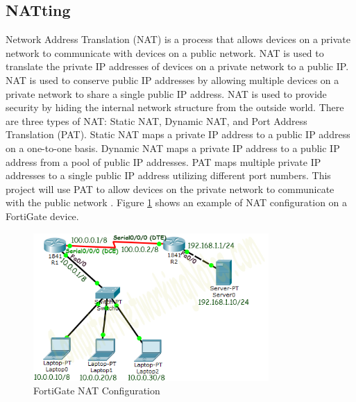 \documentclass[12pt]{report}
\begin{document}
\subsection{NATting}
Network Address Translation (NAT) is a process that allows devices on a private network to communicate with devices on a public network. NAT is used to translate the private IP addresses of devices on a private network to a public IP. NAT is used to conserve public IP addresses by allowing multiple devices on a private network to share a single public IP address. NAT is used to provide security by hiding the internal network structure from the outside world. There are three types of NAT: Static NAT, Dynamic NAT, and Port Address Translation (PAT). Static NAT maps a private IP address to a public IP address on a one-to-one basis. Dynamic NAT maps a private IP address to a public IP address from a pool of public IP addresses. PAT maps multiple private IP addresses to a single public IP address utilizing different port numbers. This project will use PAT to allow devices on the private network to communicate with the public network \cite{NATTing}. Figure \ref{fig:NAT} shows an example of NAT configuration on a FortiGate device.
\begin{figure}[h]
    \centering
    \includegraphics[width=0.8\textwidth]{images/nat.png}
    \caption{FortiGate NAT Configuration \cite{NATIMG}}
    \label{fig:NAT}
\end{figure}
\end{document}
